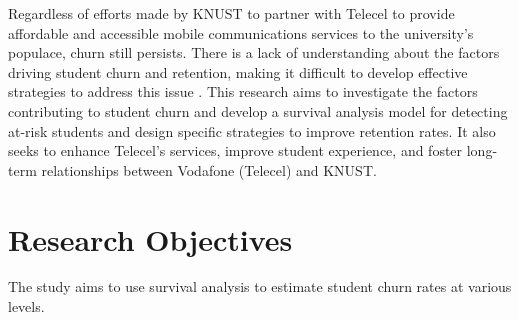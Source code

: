 \documentclass[doublespacing]{report} %
\begin{document}
Regardless of efforts made by KNUST to partner with Telecel to provide affordable and accessible mobile communications services to the university’s populace, churn still persists. There is a lack of understanding about the factors driving student churn and retention, making it difficult to develop effective strategies to address this issue \citeauthor{kapur2018}. This research aims to investigate the factors contributing to student churn and develop a survival analysis model for detecting at-risk students and design specific strategies to improve retention rates. It also seeks to enhance Telecel’s services, improve student experience, and foster long-term relationships between Vodafone (Telecel) and KNUST.

\section{Research Objectives}

The study aims to use survival analysis to estimate student churn rates at various levels.
%	
\end{document}
